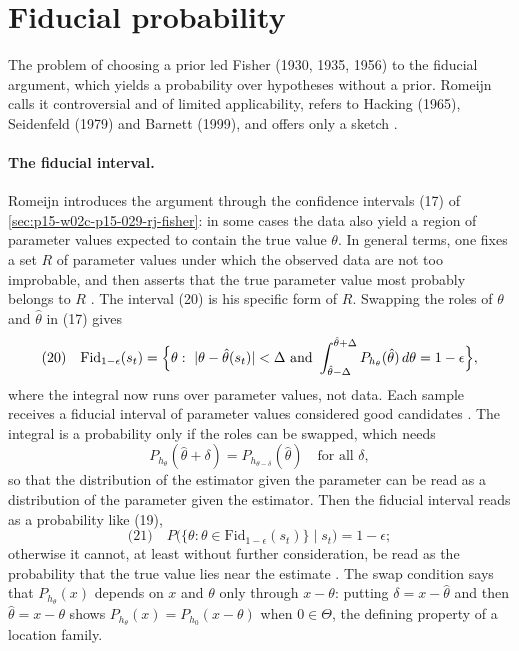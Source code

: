 \section{Fiducial probability}
\label{sec:p15-w02c-p15-029-rj-fiducial}

The problem of choosing a prior led Fisher (1930, 1935, 1956) to the
fiducial argument, which yields a probability over hypotheses without a
prior. Romeijn calls it controversial and of limited applicability,
refers to Hacking (1965), Seidenfeld (1979) and Barnett (1999), and
offers only a sketch \cite[p.~646]{Romeijn2011InductiveLogicStatistics}.

\paragraph{The fiducial interval.}
Romeijn introduces the argument through the confidence intervals (17) of
\cref{sec:p15-w02c-p15-029-rj-fisher}: in some cases the data also
yield a region of parameter values expected to contain the true value
\(\theta\). In general terms, one fixes a set \(R\) of parameter values
under which the observed data are not too improbable, and then asserts
that the true parameter value most probably belongs to \(R\)
\cite[p.~646]{Romeijn2011InductiveLogicStatistics}. The interval (20)
is his specific form of \(R\). Swapping the roles of \(\theta\) and \(\hat\theta\) in (17) gives
\[
 \text{(20)}\quad \mathrm{Fid}_{1-\epsilon}(s_t)=\Bigl\{\theta:\ |\theta-\hat\theta(s_t)|<\Delta\ \text{and}\ \int_{\hat\theta-\Delta}^{\hat\theta+\Delta}P_{h_\theta}(\hat\theta)\,d\theta=1-\epsilon\Bigr\},
\]
where the integral now runs over parameter values, not data. Each
sample receives a fiducial interval of parameter values considered good
candidates \cite[pp.~646--647]{Romeijn2011InductiveLogicStatistics}.
The integral is a probability only if the roles can be swapped, which
needs
\[
 P_{h_\theta}(\hat\theta+\delta)=P_{h_{\theta-\delta}}(\hat\theta)\quad\text{for all }\delta,
\]
so that the distribution of the estimator given the parameter can be
read as a distribution of the parameter given the estimator. Then the
fiducial interval reads as a probability like (19),
\[
 \text{(21)}\quad P\bigl(\{\theta:\theta\in\mathrm{Fid}_{1-\epsilon}(s_t)\}\mid s_t\bigr)=1-\epsilon;
\]
otherwise it cannot, at least without further consideration, be read as
the probability that the true value lies near the estimate
\cite[p.~647]{Romeijn2011InductiveLogicStatistics}. The swap condition
says that \(P_{h_\theta}(x)\) depends on \(x\) and \(\theta\) only
through \(x-\theta\): putting \(\delta=x-\hat\theta\) and then
\(\hat\theta=x-\theta\) shows \(P_{h_\theta}(x)=P_{h_0}(x-\theta)\) when
\(0\in\Theta\), the defining property of a location family.

